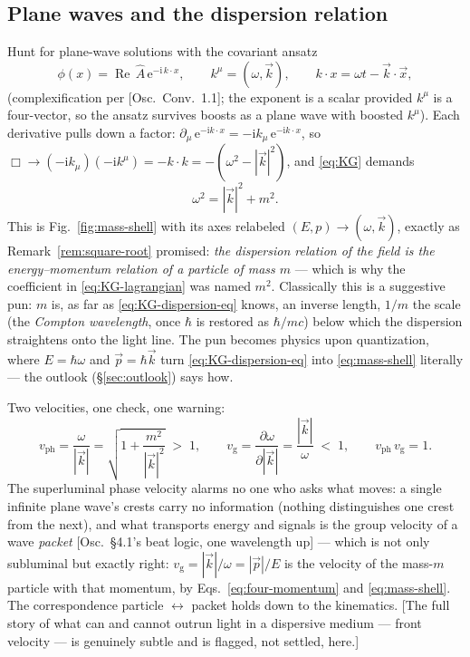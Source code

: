 \documentclass[11pt]{article}
\theoremstyle{plain}
\theoremstyle{definition}
\theoremstyle{remark}
\newcommand{\ee}{\mathrm{e}}
\newcommand{\ii}{\mathrm{i}}
\newcommand{\pd}[2]{\frac{\partial #1}{\partial #2}}
\newcommand{\vx}{\vec{x}}
\newcommand{\vp}{\vec{p}}
\begin{document}
\subsection{Plane waves and the dispersion relation}
\label{sec:KG-dispersion}

Hunt for plane-wave solutions with the covariant ansatz
\begin{equation}
  \phi(x) = \operatorname{Re}\,
  \hat A\, \ee^{-\ii\, k\cdot x},
  \qquad
  k^\mu = (\omega, \vec k),
  \qquad
  k\cdot x = \omega t - \vec k \cdot \vx ,
\end{equation}
(complexification per [Osc.\ Conv.\ 1.1]; the exponent is a scalar
provided $k^\mu$ is a four-vector, so the ansatz survives boosts as a
plane wave with boosted $k^\mu$). Each derivative pulls down a factor:
$\partial_\mu\,\ee^{-\ii k\cdot x} = -\ii k_\mu\,\ee^{-\ii k\cdot x}$,
so $\Box \to (-\ii k_\mu)(-\ii k^\mu) = -k\cdot k = -(\omega^2 -
|\vec k|^2)$, and \eqref{eq:KG} demands
\begin{equation}
  \boxed{\;
  \omega^2 = |\vec k|^2 + m^2 .
  \;}
  \label{eq:KG-dispersion-eq}
\end{equation}
This is Fig.~\ref{fig:mass-shell} with its axes relabeled
$(E, p) \to (\omega, \vec k)$, exactly as Remark~\ref{rem:square-root}
promised: \emph{the dispersion relation of the field is the
energy--momentum relation of a particle of mass $m$} --- which is why
the coefficient in \eqref{eq:KG-lagrangian} was named $m^2$.
Classically this is a suggestive pun: $m$ is, as far as
\eqref{eq:KG-dispersion-eq} knows, an inverse length, $1/m$ the scale
(the \emph{Compton wavelength}, once $\hbar$ is restored as
$\hbar/mc$) below which the dispersion straightens onto the light
line. The pun becomes physics upon quantization, where
$E = \hbar\omega$ and $\vp = \hbar\vec k$ turn
\eqref{eq:KG-dispersion-eq} into \eqref{eq:mass-shell} literally ---
the outlook (\S\ref{sec:outlook}) says how.

Two velocities, one check, one warning:
\begin{equation}
  v_{\text{ph}} = \frac{\omega}{|\vec k|}
  = \sqrt{1 + \frac{m^2}{|\vec k|^2}} \;>\; 1,
  \qquad
  v_{\text{g}} = \pd{\omega}{|\vec k|}
  = \frac{|\vec k|}{\omega} \;<\; 1,
  \qquad
  v_{\text{ph}}\, v_{\text{g}} = 1 .
\end{equation}
The superluminal phase velocity alarms no one who asks what moves: a
single infinite plane wave's crests carry no information (nothing
distinguishes one crest from the next), and what transports energy and
signals is the group velocity of a wave \emph{packet}
[Osc.\ \S4.1's beat logic, one wavelength up] --- which is not only
subluminal but exactly right:
$v_{\text{g}} = |\vec k|/\omega = |\vp|/E$ is the velocity of the
mass-$m$ particle with that momentum, by
Eqs.~\eqref{eq:four-momentum} and \eqref{eq:mass-shell}. The
correspondence particle $\leftrightarrow$ packet holds down to the
kinematics. [The full story of what can and cannot outrun light in a
dispersive medium --- front velocity --- is genuinely subtle and is
flagged, not settled, here.]
\end{document}
